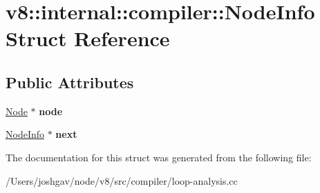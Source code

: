\hypertarget{structv8_1_1internal_1_1compiler_1_1_node_info}{}\section{v8\+:\+:internal\+:\+:compiler\+:\+:Node\+Info Struct Reference}
\label{structv8_1_1internal_1_1compiler_1_1_node_info}
\subsection*{Public Attributes}
\begin{DoxyCompactItemize}
\item 
\hyperlink{classv8_1_1internal_1_1compiler_1_1_node}{Node} $\ast$ {\bfseries node}\hypertarget{structv8_1_1internal_1_1compiler_1_1_node_info_ad53b75e8b1033c8f7f0e074714978e14}{}\label{structv8_1_1internal_1_1compiler_1_1_node_info_ad53b75e8b1033c8f7f0e074714978e14}

\item 
\hyperlink{structv8_1_1internal_1_1compiler_1_1_node_info}{Node\+Info} $\ast$ {\bfseries next}\hypertarget{structv8_1_1internal_1_1compiler_1_1_node_info_a8a406196c168b096d076f4f2e9394bb0}{}\label{structv8_1_1internal_1_1compiler_1_1_node_info_a8a406196c168b096d076f4f2e9394bb0}

\end{DoxyCompactItemize}


The documentation for this struct was generated from the following file\+:\begin{DoxyCompactItemize}
\item 
/\+Users/joshgav/node/v8/src/compiler/loop-\/analysis.\+cc\end{DoxyCompactItemize}
